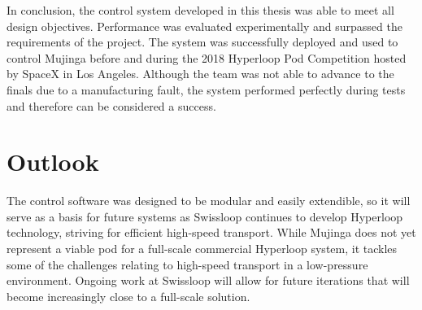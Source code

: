 
In conclusion, the control system developed in this thesis was able to meet all design objectives. Performance was evaluated experimentally and surpassed the requirements of the project. The system was successfully deployed and used to control Mujinga before and during the 2018 Hyperloop Pod Competition hosted by SpaceX in Los Angeles. Although the team was not able to advance to the finals due to a manufacturing fault, the system performed perfectly during tests and therefore can be considered a success.

\section{Outlook}

The control software was designed to be modular and easily extendible, so it will serve as a basis for future systems as Swissloop continues to develop Hyperloop technology, striving for efficient high-speed transport. While Mujinga does not yet represent a viable pod for a full-scale commercial Hyperloop system, it tackles some of the challenges relating to high-speed transport in a low-pressure environment. Ongoing work at Swissloop will allow for future iterations that will become increasingly close to a full-scale solution.
